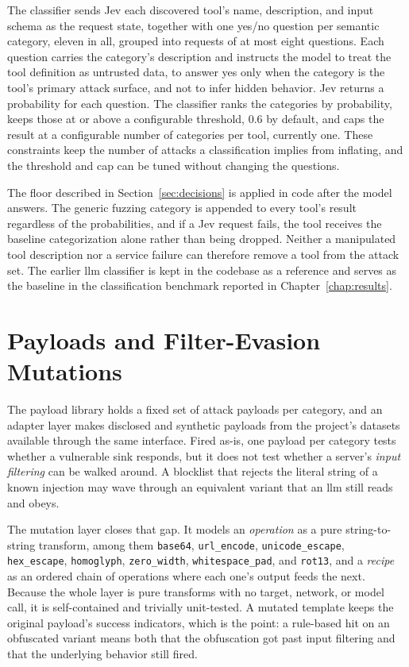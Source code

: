 The classifier sends Jev each discovered tool's name, description, and input schema as the request state, together with one yes/no question per semantic category, eleven in all, grouped into requests of at most eight questions. Each question carries the category's description and instructs the model to treat the tool definition as untrusted data, to answer yes only when the category is the tool's primary attack surface, and not to infer hidden behavior. Jev returns a probability for each question. The classifier ranks the categories by probability, keeps those at or above a configurable threshold, 0.6 by default, and caps the result at a configurable number of categories per tool, currently one. These constraints keep the number of attacks a classification implies from inflating, and the threshold and cap can be tuned without changing the questions.

The floor described in Section~\ref{sec:decisions} is applied in code after the model answers. The generic fuzzing category is appended to every tool's result regardless of the probabilities, and if a Jev request fails, the tool receives the baseline categorization alone rather than being dropped. Neither a manipulated tool description nor a service failure can therefore remove a tool from the attack set. The earlier \gls{llm} classifier is kept in the codebase as a reference and serves as the baseline in the classification benchmark reported in Chapter~\ref{chap:results}.

\section{Payloads and Filter-Evasion Mutations}
\label{sec:payloads}

The payload library holds a fixed set of attack \glspl{payload} per category, and an adapter layer makes disclosed and synthetic payloads from the project's datasets available through the same interface. Fired as-is, one payload per category tests whether a vulnerable \gls{sink} responds, but it does not test whether a server's \emph{input filtering} can be walked around. A blocklist that rejects the literal string of a known injection may wave through an equivalent variant that an \gls{llm} still reads and obeys.

The mutation layer closes that gap. It models an \emph{operation} as a pure string-to-string transform, among them \texttt{base64}, \texttt{url\_encode}, \texttt{unicode\_escape}, \texttt{hex\_escape}, \texttt{homoglyph}, \texttt{zero\_width}, \texttt{whitespace\_pad}, and \texttt{rot13}, and a \emph{recipe} as an ordered chain of operations where each one's output feeds the next. Because the whole layer is pure transforms with no target, network, or model call, it is self-contained and trivially unit-tested. A mutated template keeps the original payload's success indicators, which is the point: a rule-based hit on an obfuscated variant means both that the obfuscation got past input filtering and that the underlying behavior still fired.

